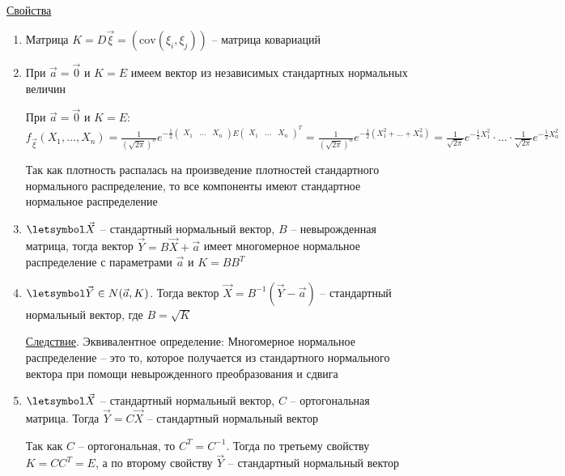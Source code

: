 \begin{enumerate}
    \underline{Свойства}

    \begin{enumerate}
        \item Матрица $K = D \vec \xi = \left(\mathrm{cov} (\xi_i, \xi_j)\right)$ -- матрица ковариаций

        \item При $\vec a = \vec 0$ и $K = E$ имеем вектор из независимых стандартных нормальных величин

        \begin{MyProof}
            При $\vec a = \vec 0$ и $K = E$: $f_{\vec \xi} (X_1, \dots, X_n) = \frac{1}{\left(\sqrt{2\pi}\right)^n} 
            e^{-\frac{1}{2} \begin{pmatrix}X_1 & \dots & X_n\end{pmatrix} E \begin{pmatrix}X_1 & \dots & X_n\end{pmatrix}^T} = 
            \frac{1}{\left(\sqrt{2\pi}\right)^n} e^{-\frac{1}{2} (X_1^2 + \dots + X_n^2)} = 
            \frac{1}{\sqrt{2\pi}} e^{-\frac{1}{2} X_1^2} \cdot \dots \cdot \frac{1}{\sqrt{2\pi}} e^{-\frac{1}{2} X_n^2}$

            Так как плотность распалась на произведение плотностей стандартного нормального распределение, то все компоненты имеют стандартное нормальное распределение
        \end{MyProof}

        \item $\letsymbol \vec X$ -- стандартный нормальный вектор, $B$ -- невырожденная матрица, 
        тогда вектор $\vec Y = B \vec X + \vec a$ имеет многомерное нормальное распределение с параметрами $\vec a$ и $K = B B^T$

        \item $\letsymbol \vec Y \in N(\vec a, K)$. Тогда вектор $\vec X = B^{-1} (\vec Y - \vec a)$ -- стандартный нормальный вектор, где $B = \sqrt{K}$

        \underline{Следствие}. Эквивалентное определение: Многомерное нормальное распределение -- это то, которое получается из
        стандартного нормального вектора при помощи невырожденного преобразования и сдвига

        \item $\letsymbol \vec X$ -- стандартный нормальный вектор, $C$ -- ортогональная матрица. Тогда $\vec Y = C \vec X$ -- стандартный нормальный вектор

        \begin{MyProof}
            Так как $C$ -- ортогональная, то $C^T = C^{-1}$. Тогда по третьему свойству $K = C C^T = E$, а по второму свойству $\vec Y$ -- стандартный нормальный вектор
        \end{MyProof}


\end{enumerate}
\end{enumerate}
